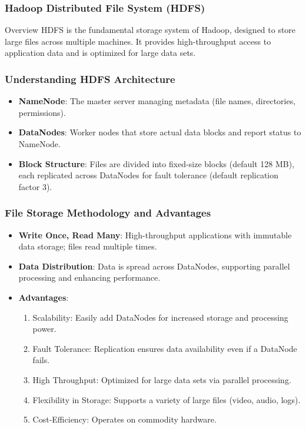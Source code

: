 \documentclass[aspectratio=169]{beamer}
\begin{document}
\begin{frame}[fragile]
    \frametitle{Hadoop Distributed File System (HDFS)}
    \begin{block}{Overview}
        HDFS is the fundamental storage system of Hadoop, designed to store large files across multiple machines. 
        It provides high-throughput access to application data and is optimized for large data sets.
    \end{block}
\end{frame}

\begin{frame}[fragile]
    \frametitle{Understanding HDFS Architecture}
    \begin{itemize}
        \item \textbf{NameNode}: The master server managing metadata (file names, directories, permissions).
        \item \textbf{DataNodes}: Worker nodes that store actual data blocks and report status to NameNode.
        \item \textbf{Block Structure}: Files are divided into fixed-size blocks (default 128 MB), each replicated across DataNodes for fault tolerance (default replication factor 3).
    \end{itemize}
\end{frame}

\begin{frame}[fragile]
    \frametitle{File Storage Methodology and Advantages}
    \begin{itemize}
        \item \textbf{Write Once, Read Many}: High-throughput applications with immutable data storage; files read multiple times.
        \item \textbf{Data Distribution}: Data is spread across DataNodes, supporting parallel processing and enhancing performance.
        \item \textbf{Advantages}:
            \begin{enumerate}
                \item Scalability: Easily add DataNodes for increased storage and processing power.
                \item Fault Tolerance: Replication ensures data availability even if a DataNode fails.
                \item High Throughput: Optimized for large data sets via parallel processing.
                \item Flexibility in Storage: Supports a variety of large files (video, audio, logs).
                \item Cost-Efficiency: Operates on commodity hardware.
            \end{enumerate}
    \end{itemize}
\end{frame}
\end{document}
